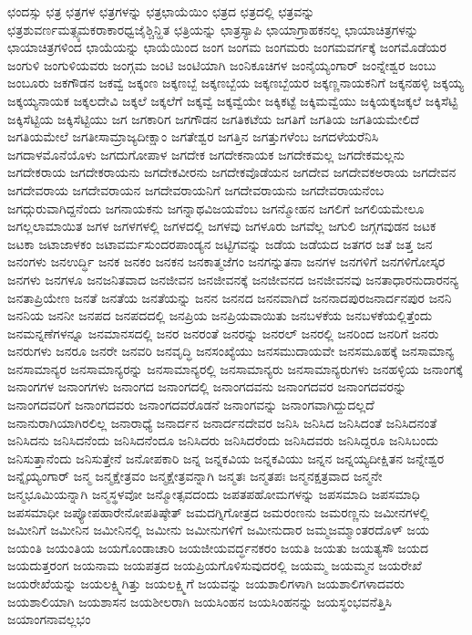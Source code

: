 {ಛಂದಸ್ಸು
ಛತ್ರ
ಛತ್ರಗಳ
ಛತ್ರಗಳನ್ನು
ಛತ್ರಛಾಯೆಯಿಂ
ಛತ್ರದ
ಛತ್ರದಲ್ಲಿ
ಛತ್ರವನ್ನು
ಛತ್ರಶುವರ್ಣಮತ್ಸ್ಯಮಕರಾಕಾರಧ್ವಜೈಶ್ಚಿನ್ಹಿತ
ಛತ್ರಿಯನ್ನು
ಛಾತ್ರಸ್ಯಾಪಿ
ಛಾಯಾಗ್ರಾಹಕನಲ್ಲ
ಛಾಯಾಚಿತ್ರಗಳನ್ನು
ಛಾಯಾಚಿತ್ರಗಳಿಂದ
ಛಾಯೆಯನ್ನು
ಛಾಯೆಯಿಂದ
ಜಂಗ
ಜಂಗಮ
ಜಂಗಮರು
ಜಂಗಮವರ್ಗಕ್ಕೆ
ಜಂಗಮೊಡೆಯರ
ಜಂಗುಳಿ
ಜಂಗುಳಿಯವರು
ಜಂಗ್ಗಮ
ಜಂಟಿ
ಜಂಟಿಯಾಗಿ
ಜಂನಿಕೂಚಿಗಳ
ಜಂನೈಯ್ಯಂಗಾರ್
ಜಂನ್ನೇಶ್ವರ
ಜಂಬು
ಜಂಬೂರು
ಜಕಗೌಡನ
ಜಕವ್ವೆ
ಜಕ್ಕಂಣ
ಜಕ್ಕಣಬ್ಬೆ
ಜಕ್ಕಣಬ್ಬೆಯ
ಜಕ್ಕಣಬ್ಬೆಯರ
ಜಕ್ಕಣ್ಣನಾಯಕನಿಗೆ
ಜಕ್ಕನಹಳ್ಳಿ
ಜಕ್ಕಯ್ಯ
ಜಕ್ಕಯ್ಯನಾಯಕ
ಜಕ್ಕಲದೇವಿ
ಜಕ್ಕಲೆ
ಜಕ್ಕಲೆಗೆ
ಜಕ್ಕವ್ವೆ
ಜಕ್ಕವ್ವೆಯೇ
ಜಕ್ಕಿಕಟ್ಟೆ
ಜಕ್ಕಿಮವ್ವೆಯು
ಜಕ್ಕಿಯಕ್ಕಜಕ್ಕಲೆ
ಜಕ್ಕಿಸೆಟ್ಟಿ
ಜಕ್ಕಿಸೆಟ್ಟಿಯ
ಜಕ್ಕಿಸೆಟ್ಟಿಯು
ಜಗ
ಜಗಕಾರಿಗ
ಜಗಗೌಡನ
ಜಗತಿಕಟೆಯ
ಜಗತಿಗೆ
ಜಗತಿಯ
ಜಗತಿಯಮೇಲಿದೆ
ಜಗತಿಯಮೇಲೆ
ಜಗತೀಸಾಮ್ರಾಜ್ಯದೀಕ್ಷಾಂ
ಜಗತೇಶ್ವರ
ಜಗತ್ತಿನ
ಜಗತ್ತುಗಳೆಂಬ
ಜಗದಳೆಯರೆನಿಸಿ
ಜಗದಾಳಮೊನೆಯೊಳು
ಜಗದುಗೋಪಾಳ
ಜಗದೇಕ
ಜಗದೇಕನಾಯಕ
ಜಗದೇಕಮಲ್ಲ
ಜಗದೇಕಮಲ್ಲನು
ಜಗದೇಕರಾಯ
ಜಗದೇಕರಾಯನು
ಜಗದೇಕವೀರನು
ಜಗದೇಕವೊಡೆಯನ
ಜಗದೇವ
ಜಗದೇವಕಅರಾಯ
ಜಗದೇವನ
ಜಗದೇವರಾಯ
ಜಗದೇವರಾಯನ
ಜಗದೇವರಾಯನಿಗೆ
ಜಗದೇವರಾಯನು
ಜಗದೇವರಾಯನೆಂಬ
ಜಗದ್ಗುರುವಾಗಿದ್ದನೆಂದು
ಜಗನಾಯಕನು
ಜಗನ್ನಾಥವಿಜಯವೆಂಬ
ಜಗನ್ಮೋಹನ
ಜಗಲಿಗೆ
ಜಗಲಿಯಮೇಲೂ
ಜಗಲ್ಲಲಾಮಾಯಿತ
ಜಗಳ
ಜಗಳಗಳಲ್ಲಿ
ಜಗಳದಲ್ಲಿ
ಜಗಳವು
ಜಗಳೂರು
ಜಗವೆಲ್ಲ
ಜಗುಲಿ
ಜಗ್ಗಗವುಡನ
ಜಟಕ
ಜಟಕಾ
ಜಟಾಜಾಳಕಂ
ಜಟಾವರ್ಮಸುಂದರಪಾಂಡ್ಯನ
ಜಟ್ಟಿಗವನ್ನು
ಜಡೆಯ
ಜಡೆಯದ
ಜತಗರ
ಜತೆ
ಜತ್ತ
ಜನ
ಜನಂಗಳು
ಜನಉರ್ದ್ಧಿ
ಜನಕ
ಜನಕಂ
ಜನಕನ
ಜನಕಾತ್ಮಜೆಗಂ
ಜನಗನ್ನುತನಾ
ಜನಗಳ
ಜನಗಳಿಗೆ
ಜನಗಳಿಗೋಸ್ಕರ
ಜನಗಳು
ಜನಗಳೂ
ಜನಜನಿತವಾದ
ಜನಜೀವನ
ಜನಜೀವನಕ್ಕೆ
ಜನಜೀವನದ
ಜನಜೀವನವು
ಜನತಾಧಾರನುದಾರನನ್ಯ
ಜನತಾಪ್ರಿಯೇಣ
ಜನತೆ
ಜನತೆಯ
ಜನತೆಯನ್ನು
ಜನನ
ಜನನದ
ಜನನವಾಗಿದೆ
ಜನನಾದಪುರಜನಾರ್ದನಪುರ
ಜನನಿ
ಜನನಿಯ
ಜನನೀ
ಜನಪದ
ಜನಪದದಲ್ಲಿ
ಜನಪ್ರಿಯ
ಜನಪ್ರಿಯವಾಯಿತು
ಜನಬಳಕೆಯ
ಜನಬಳಕೆಯಲ್ಲಿತ್ತೆಂದು
ಜನಮನ್ನಣೆಗಳನ್ನೂ
ಜನಮಾನಸದಲ್ಲಿ
ಜನರ
ಜನರಂತೆ
ಜನರನ್ನು
ಜನರಲ್
ಜನರಲ್ಲಿ
ಜನರಿಂದ
ಜನರಿಗೆ
ಜನರು
ಜನರುಗಳು
ಜನರೂ
ಜನರೇ
ಜನವರಿ
ಜನವೃದ್ಧಿ
ಜನಸಂಖ್ಯೆಯು
ಜನಸಮುದಾಯವೇ
ಜನಸಮೂಹಕ್ಕೆ
ಜನಸಾಮಾನ್ಯ
ಜನಸಾಮಾನ್ಯರ
ಜನಸಾಮಾನ್ಯರನ್ನು
ಜನಸಾಮಾನ್ಯರಲ್ಲಿ
ಜನಸಾಮಾನ್ಯರು
ಜನಸಾಮಾನ್ಯರುಗಳು
ಜನಹಳ್ಳಿಯ
ಜನಾಂಗಕ್ಕೆ
ಜನಾಂಗಗಳ
ಜನಾಂಗಗಳು
ಜನಾಂಗದ
ಜನಾಂಗದಲ್ಲಿ
ಜನಾಂಗದವನು
ಜನಾಂಗದವರ
ಜನಾಂಗದವರನ್ನು
ಜನಾಂಗದವರಿಗೆ
ಜನಾಂಗದವರು
ಜನಾಂಗದವರೊಡನೆ
ಜನಾಂಗವನ್ನು
ಜನಾಂಗವಾಗಿದ್ದುದಲ್ಲದೆ
ಜನಾನುರಾಗಿಯಾಗಿರಲಿಲ್ಲ
ಜನಾರಾಧ್ಯೆ
ಜನಾರ್ದನ
ಜನಾರ್ದನದೇವರ
ಜನಿಸಿ
ಜನಿಸಿದ
ಜನಿಸಿದಂತೆ
ಜನಿಸಿದನಂತೆ
ಜನಿಸಿದನು
ಜನಿಸಿದನೆಂದು
ಜನಿಸಿದನೆಂದೂ
ಜನಿಸಿದರು
ಜನಿಸಿದರೆಂದು
ಜನಿಸಿದವರು
ಜನಿಸಿದ್ದರೂ
ಜನಿಸಿಬಂದು
ಜನಿಸುತ್ತಾನೆಂದು
ಜನಿಸುತ್ತೇನೆ
ಜನೋಪಕಾರಿ
ಜನ್ನ
ಜನ್ನಕವಿಯ
ಜನ್ನಕವಿಯು
ಜನ್ನನ
ಜನ್ನಯ್ಯದೀಕ್ಷಿತನ
ಜನ್ನೇಶ್ವರ
ಜನ್ನೈಯ್ಯಂಗಾರ್
ಜನ್ಮ
ಜನ್ಮಕ್ಷೇತ್ರವಂ
ಜನ್ಮಕ್ಷೇತ್ರವನ್ನಾಗಿ
ಜನ್ಮತಃ
ಜನ್ಮತಪಃ
ಜನ್ಮನಕ್ಷತ್ರವಾದ
ಜನ್ಮನೇ
ಜನ್ಮಭೂಮಿಯನ್ನಾಗಿ
ಜನ್ಮಸ್ಥಳವೋ
ಜನ್ಮೋತ್ಸವದಂದು
ಜಪತಪಹೋಮಗಳನ್ನು
ಜಪಸಮಾದಿ
ಜಪಸಮಾಧಿ
ಜಪಸಮಾಧೀ
ಜಪ್ಯೋಪಹಾರೇನೋಪತಿಷ್ಠೇತ್
ಜಮದಗ್ನಿಗೋತ್ರದ
ಜಮರಂಣನು
ಜಮರಣ್ಣನು
ಜಮೀನಗಳಲ್ಲಿ
ಜಮೀನಿಗೆ
ಜಮೀನಿನ
ಜಮೀನಿನಲ್ಲಿ
ಜಮೀನು
ಜಮೀನುಗಳಿಗೆ
ಜಮೀನುದಾರ
ಜಮ್ಮಜಮ್ಮಾಂತರದೊಳ್
ಜಯ
ಜಯಂತಿ
ಜಯಂತಿಯ
ಜಯಗೊಂಡಾಚಾರಿ
ಜಯಜೀಯವರ್ದ್ಧನಕರಂ
ಜಯತಿ
ಜಯತು
ಜಯತ್ಯಸೌ
ಜಯದ
ಜಯದುತ್ತರಂಗ
ಜಯನಾಮ
ಜಯಪತ್ರದ
ಜಯಪ್ರಿಯಗೊಳಿಸುವುದರಲ್ಲಿ
ಜಯಮ್ಮ
ಜಯಮ್ಮನ
ಜಯರೇಖೆ
ಜಯರೇಖೆಯನ್ನು
ಜಯಲಕ್ಷ್ಮಿಗಿತ್ತು
ಜಯಲಕ್ಷ್ಮಿಗೆ
ಜಯವನ್ನು
ಜಯಶಾಲಿಗಳಾಗಿ
ಜಯಶಾಲಿಗಳಾದವರು
ಜಯಶಾಲಿಯಾಗಿ
ಜಯಶಾಸನ
ಜಯಶೀಲರಾಗಿ
ಜಯಸಿಂಹನ
ಜಯಸಿಂಹನನ್ನು
ಜಯಸ್ಥಂಭವನೆತ್ತಿಸಿ
ಜಯಾಂಗನಾವಲ್ಲಭಂ
}
